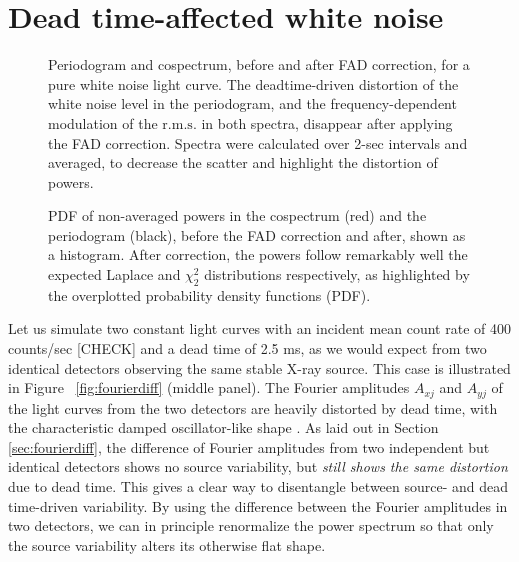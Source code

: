 \documentclass[twocolumn]{aastex61}
\newcommand{\rms}{\ensuremath{\mathrm{r.m.s.}}\xspace}
\begin{document}

\section{Dead time-affected white noise} \label{sec:wndeadtime}

\begin{figure*}
\caption{Periodogram and cospectrum, before and after FAD correction, for a pure white noise light curve. 
The deadtime-driven distortion of the white noise level in the periodogram, and the frequency-dependent modulation of the \rms in both spectra, disappear after applying the FAD correction. 
Spectra were calculated over 2-sec intervals and averaged, to decrease the scatter and highlight the distortion of powers.}
\label{fig:comparison}
\end{figure*}

\begin{figure*}
\caption{PDF of non-averaged powers in the cospectrum (red) and the periodogram (black), before the FAD correction and after, shown as a histogram. 
After correction, the powers follow remarkably well the expected Laplace and $\chi^2_2$ distributions respectively, as highlighted by the overplotted probability density functions (PDF).}
\label{fig:dist}
\end{figure*}

Let us simulate two constant light curves with an incident mean count rate of 400 counts/sec [CHECK] and a dead time of 2.5 ms, as we would expect from two identical detectors observing the same stable X-ray source. 
This case is illustrated in Figure ~\ref{fig:fourierdiff} (middle panel).
The Fourier amplitudes $A_{xj}$ and $A_{yj}$ of the light curves from the two detectors are heavily distorted by dead time, with the characteristic damped oscillator-like shape \citep{Vikhlinin+94,Zhang+95}. 
As laid out in Section \ref{sec:fourierdiff}, the difference of Fourier amplitudes from two independent but identical detectors shows no source variability, but \textit{still shows the same distortion} due to dead time.
This gives a clear way to disentangle between source- and dead time-driven variability.
By using the difference between the Fourier amplitudes in two detectors, we can in principle renormalize the power spectrum so that only the source variability alters its otherwise flat shape.
\end{document}
